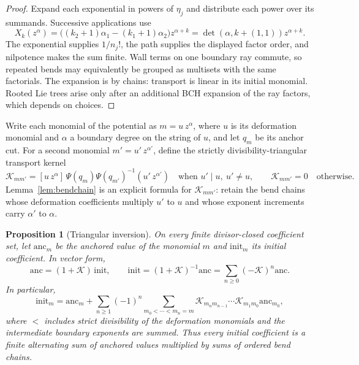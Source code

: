 \documentclass[11pt]{amsart}
\newtheorem{proposition}[theorem]{Proposition}
\theoremstyle{definition}
\theoremstyle{remark}
\begin{document}
\begin{proof}
Expand each exponential in powers of $\eta_j$ and distribute each power over
its summands.  Successive applications use
\[
 X_k(z^\alpha)=\bigl((k_2+1)\alpha_1-(k_1+1)\alpha_2\bigr)z^{\alpha+k}
 =\det(\alpha,k+(1,1))z^{\alpha+k}.
\]
The exponential supplies $1/n_j!$, the path supplies the displayed factor
order, and nilpotence makes the sum finite.  Wall terms on one boundary ray
commute, so repeated bends may equivalently be grouped as multisets with the
same factorials.  The expansion is by chains: transport is linear
in its initial monomial.  Rooted Lie trees arise only after an additional
BCH expansion of the ray factors, which depends on choices.  \qedhere
\end{proof}

Write each monomial of the potential as $m=u\,z^\alpha$, where $u$ is its
deformation monomial and $\alpha$ a boundary degree on the string of $u$, and
let $q_m$ be its anchor cut.  For a second monomial $m'=u'\,z^{\alpha'}$, define
the strictly divisibility-triangular transport kernel
\begin{equation}
\label{eq:transportkernel}
 \mathcal K_{mm'}=
 [u\,z^\alpha]\,\Psi(q_m)\Psi(q_{m'})^{-1}(u'\,z^{\alpha'})
 \quad\text{when }u'\mid u,\ u'\ne u,
 \qquad \mathcal K_{mm'}=0\quad\text{otherwise}.
\end{equation}
Lemma~\ref{lem:bendchain} is an explicit formula for $\mathcal K_{mm'}$: retain the
bend chains whose deformation coefficients multiply $u'$ to $u$ and whose
exponent increments carry $\alpha'$ to $\alpha$.

\begin{proposition}[Triangular inversion]
\label{thm:seedinversion}
On every finite divisor-closed coefficient set, let $\mathrm{anc}_m$ be the
anchored value of the monomial $m$ and $\mathrm{init}_m$ its initial
coefficient.  In vector form,
\begin{equation}
\label{eq:seedmatrix}
 \mathrm{anc}=(1+\mathcal K)\,\mathrm{init},\qquad
 \mathrm{init}=(1+\mathcal K)^{-1}\mathrm{anc}=\sum_{n\ge0}(-\mathcal K)^n\mathrm{anc}.
\end{equation}
In particular,
\begin{equation}
\label{eq:seedchain}
 \mathrm{init}_m=\mathrm{anc}_m+
 \sum_{n\ge1}(-1)^n
 \sum_{m_0<\cdots<m_n=m}
 \mathcal K_{m_nm_{n-1}}\cdots \mathcal K_{m_1m_0}\mathrm{anc}_{m_0},
\end{equation}
where $<$ includes strict divisibility of the deformation monomials and the
intermediate boundary exponents are summed.  Thus every initial coefficient is
a finite alternating sum of anchored values multiplied by sums of ordered
bend chains.
\end{proposition}
\end{document}
